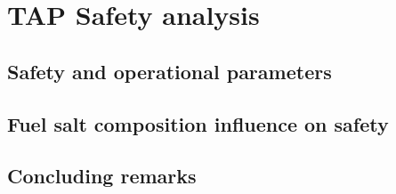 \chapter[TAP MSR Safety Analysis]{TAP Safety analysis}

\section{Safety and operational parameters}

\section{Fuel salt composition influence on safety}

\section{Concluding remarks}